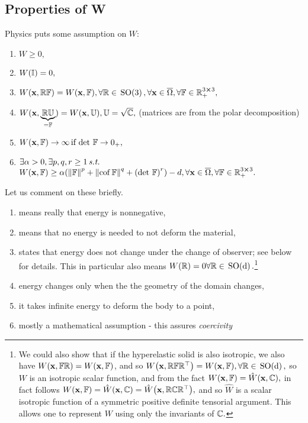 \documentclass[11pt]{scrartcl} %
\begin{document}
\subsection{Properties of W}
\label{sec:propetiesW}
Physics puts some assumption on $W:$
\begin{enumerate}
	\item $W\geq 0,$ 
	\item $W(\mathbb{I}) = 0,$
	\item $W\qty(\vb{x},\mathbb{R} \mathbb{F}) = W\qty(\vb{x},\mathbb{F}), \forall \mathbb{R} \in \, \text{SO(3)} \,, \forall \vb{x} \in \overline{\Omega}, \forall \mathbb{F} \in {\mathbb R}^{3 \cross 3}_+,$ 
	\item $W(\vb{x}, \underbrace{\mathbb{R} \mathbb{U}}_{=\mathbb{F}}) = W\qty(\vb{x}, \mathbb{U}), \mathbb{U}=\sqrt{\mathbb{C}},$ (matrices are from the polar decomposition)
	\item $W\qty(\vb{x},\mathbb{F}) \to \infty \, \text{if} \, \det\, \mathbb{F} \to 0_+,$ 
	\item $\exists \alpha >0, \exists p,q,r \geq 1 \, \text{\textit{s.t.}} \,$ $W\qty(\vb{x},\mathbb{F}) \geq \alpha\qty(\norm{\mathbb{F}}^p + \norm{\operatorname{cof} \mathbb{F}}^q + \qty(\det\, \mathbb{F})^r)-d, \forall \vb{x} \in \overline{\Omega}, \forall \mathbb{F} \in {\mathbb R}^{3 \cross 3}_+.$
\end{enumerate}
Let us comment on these briefly.
\begin{enumerate}
	\item means really that energy is nonnegative,
	\item means that no energy is needed to not deform the material,
	\item states that energy does not change under the change of observer; see below for details. This in particular also means $W\qty(\mathbb{R}) = 0 \forall \mathbb{R} \in \, \text{SO(d)} \,.$\footnote{We could also show that if the hyperelastic solid is also isotropic, we also have $W\qty(\vb{x}, \mathbb{F} \mathbb{R}) = W\qty(\vb{x},\mathbb{F})$, and so $W\qty(\vb{x}, \mathbb{R}\mathbb{F} \mathbb{R}^\top) = W\qty(\vb{x}, \mathbb{F}), \forall \mathbb{R} \in \, \text{SO(d)} \,,$ so $W$ is an isotropic scalar function, and from the fact $W\qty(\vb{x},\mathbb{F}) = \hat{W}\qty(\vb{x}, \mathbb{C}),$ in fact follows $W\qty(\vb{x}, \mathbb{F}) = \hat{W}\qty(\vb{x}, \mathbb{C} ) = \hat{W}\qty(\vb{x}, \mathbb{R} \mathbb{C} \mathbb{R}^\top),$ and so $\hat{W}$ is a scalar isotropic function of a symmetric positive definite tensorial argument. This allows one to represent $W$ using only the invariants of $\mathbb{C}.$}
	\item energy changes only when the the geometry of the domain changes,
	\item it takes infinite energy to deform the body to a point,
	\item mostly a mathematical assumption - this assures \textit{coercivity}
\end{enumerate}
\end{document}
